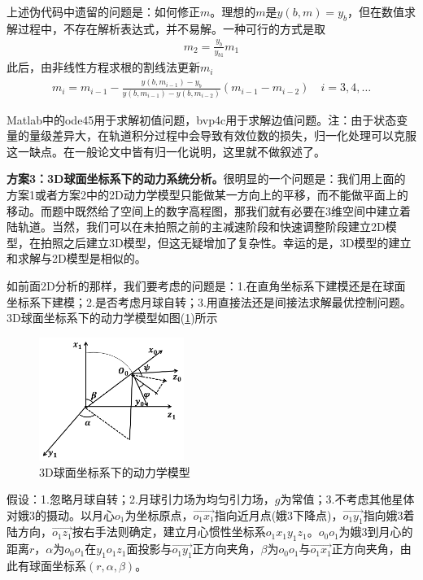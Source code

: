             \par
            上述伪代码中遗留的问题是：如何修正$m$。理想的$m$是$y(b,m) = y_b$，但在数值求解过程中，不存在解析表达式，并不易解。一种可行的方式是取
            \begin{align*}
            m_2= \frac{y_b}{y_{b1}}m_1
            \end{align*}
            此后，由非线性方程求根的割线法更新$m_i$
            \begin{align*}
            m_i = m_{i-1} - \frac{y(b,m_{i-1}) - y_b}{y(b,m_{i-1}) - y(b,m_{i-2})}(m_{i-1}- m_{i-2}) \quad i=3,4,\dots
            \end{align*}
            \par
            Matlab中的ode45用于求解初值问题，bvp4c用于求解边值问题。注：由于状态变量的量级差异大，在轨道积分过程中会导致有效位数的损失，归一化处理可以克服这一缺点。在一般论文中皆有归一化说明，这里就不做叙述了。
            \par
            \textbf{方案3：3D球面坐标系下的动力系统分析。}很明显的一个问题是：我们用上面的方案1或者方案2中的2D动力学模型只能做某一方向上的平移，而不能做平面上的移动。而题中既然给了空间上的数字高程图，那我们就有必要在3维空间中建立着陆轨道。当然，我们可以在未拍照之前的主减速阶段和快速调整阶段建立2D模型，在拍照之后建立3D模型，但这无疑增加了复杂性。幸运的是，3D模型的建立和求解与2D模型是相似的。
            \par
            如前面2D分析的那样，我们要考虑的问题是：1.在直角坐标系下建模还是在球面坐标系下建模；2.是否考虑月球自转；3.用直接法还是间接法求解最优控制问题。3D球面坐标系下的动力学模型如图(\ref{fig:3D球面坐标系下的动力学模型})所示
            \begin{figure}[H]
            \centering
            \includegraphics[height=4cm]{images/3D_Spherical.jpg}
            \caption{3D球面坐标系下的动力学模型}
            \label{fig:3D球面坐标系下的动力学模型}
            \end{figure}
            \par
            假设：1.忽略月球自转；2.月球引力场为均匀引力场，$g$为常值；3.不考虑其他星体对娥3的摄动。以月心$o_1$为坐标原点，$\overrightarrow{o_1x_1}$指向近月点(娥3下降点)，$\overrightarrow{o_1y_1}$指向娥3着陆方向，$\overrightarrow{o_1z_1}$按右手法则确定，建立月心惯性坐标系$o_1x_1y_1z_1$。$o_0o_1$为娥3到月心的距离$r$，$\alpha$为$o_0o_1$在$y_1o_1z_1$面投影与$\overrightarrow{o_1y_1}$正方向夹角，$\beta$为$o_0o_1$与$\overrightarrow{o_1x_1}$正方向夹角，由此有球面坐标系$(r,\alpha,\beta)$。
